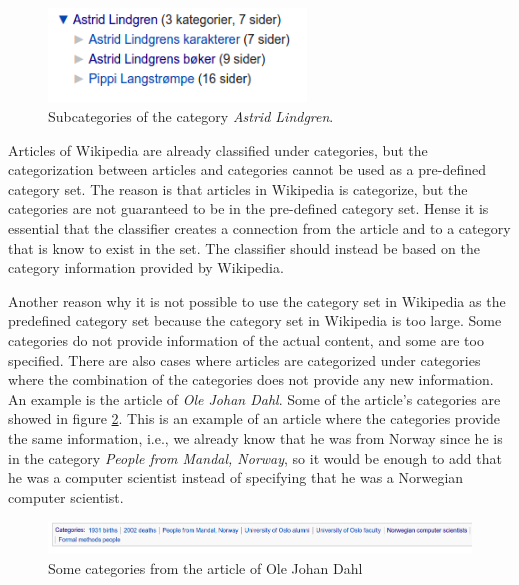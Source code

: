 \documentclass[english,a4paper]{ifimaster}
\begin{document}
\begin{figure}[H]
\centering
\includegraphics[height=2.5cm]{Dumps/imgs/Kategorier-Astrid-Lindgren.png}
\caption{Subcategories of the category \textit{Astrid Lindgren}. }
\label{fig: subcat_lindgren}
\end{figure}

Articles of Wikipedia are already classified under categories, but the categorization between articles and categories cannot be used as a pre-defined category set. The reason is that articles in Wikipedia is categorize, but the categories are not guaranteed to be in the pre-defined category set. Hense it is essential that the classifier creates a connection from the article and to a category that is know to exist in the set. The classifier should instead be based on the category information provided by Wikipedia. 

Another reason why it is not possible to use the category set in Wikipedia as the predefined category set because the category set in Wikipedia is too large. Some categories do not  provide information of the actual content, and some are too specified. There are also cases where articles are categorized under categories where the combination of the categories does not provide any new information. An example is the article of \textit{Ole Johan Dahl}. Some of the article's categories are showed in figure \ref{fig: olejohandahl_categories}. This is an example of an article where the categories provide the same information, i.e., we already know that he was from Norway since he is in the category \textit{People from Mandal, Norway}, so it would be enough to add that he was a computer scientist instead of specifying that he was a Norwegian computer scientist. 

\begin{figure}[H]
\centering
\includegraphics[width=\textwidth]{Dumps/imgs/olejohandahl-categories.png}
\caption{Some categories from the article of Ole Johan Dahl}
\label{fig: olejohandahl_categories}
\end{figure}
\end{document}
